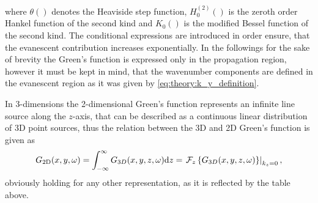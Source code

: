 \begin{center}
\end{center}
where $\theta\left( \right)$ denotes the Heaviside step function, $H_0^{(2)}\left( \right)$ is the zeroth order Hankel function of the second kind and $K_0\left( \right)$ is the modified Bessel function of the second kind.
The conditional expressions are introduced in order ensure, that the evanescent contribution increases exponentially. In the followings for the sake of brevity the Green's function is expressed only in the propagation region, however it must be kept in mind, that the wavenumber components are defined in the evanescent region as it was given by \eqref{eq:theory:k_y_definition}.

\vspace{3mm}
In 3-dimensions the 2-dimensional Green's function represents an infinite line source along the $z$-axis, that can be described as a continuous linear distribution of 3D point sources, thus the relation between the 3D and 2D Green's function is given as
\begin{equation}
G_{2\mathrm{D}}(x,y,\omega) = \int_{-\infty}^{\infty} G_{3D}(x,y,z,\omega) \mathrm{d} z = \left. \mathcal{F}_{z}\left\{ G_{3D}(x,y,z,\omega) \right\}\right|_{k_z = 0},
\end{equation} 
obviously holding for any other representation, as it is reflected by the table above.


